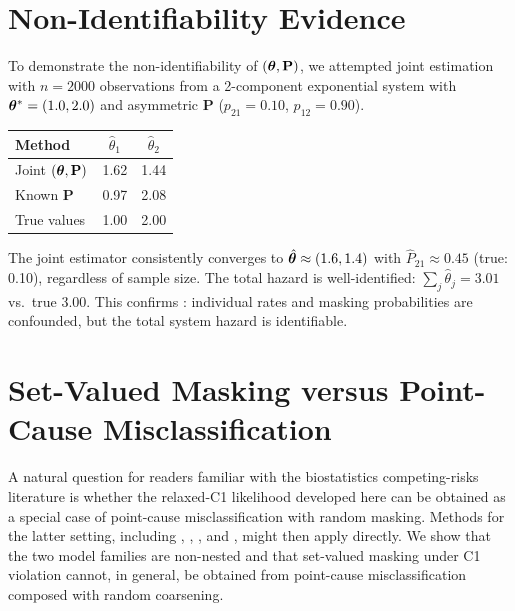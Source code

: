 \section{Non-Identifiability Evidence}
\label{sec:appendix-ident}

To demonstrate the non-identifiability of $(\bm{\theta}, \mathbf{P})$, we
attempted joint estimation with $n = 2000$ observations from a 2-component
exponential system with $\bm{\theta}^* = (1.0, 2.0)$ and asymmetric
$\mathbf{P}$ ($p_{21} = 0.10$, $p_{12} = 0.90$).

\begin{center}
\begin{tabular}{lcc}
\toprule
Method & $\hat\theta_1$ & $\hat\theta_2$ \\
\midrule
Joint $(\bm{\theta}, \mathbf{P})$ & 1.62 & 1.44 \\
Known $\mathbf{P}$ & 0.97 & 2.08 \\
True values & 1.00 & 2.00 \\
\bottomrule
\end{tabular}
\end{center}

The joint estimator consistently converges to
$\hat{\bm{\theta}} \approx (1.6, 1.4)$ with
$\hat{P}_{21} \approx 0.45$ (true: 0.10), regardless of sample size. The
total hazard is well-identified: $\sum_j \hat\theta_j = 3.01$ vs.\ true
3.00. This confirms : individual rates and masking
probabilities are confounded, but the total system hazard is identifiable.

\section{Set-Valued Masking versus Point-Cause Misclassification}
\label{app:set-vs-point}

A natural question for readers familiar with the biostatistics
competing-risks literature is whether the relaxed-C1 likelihood developed
here can be obtained as a special case of point-cause misclassification with
random masking. Methods for the latter setting, including
\citet{Ebrahimi1996}, \citet{VanRompaye2012}, \citet{HaTsodikov2015}, and
\citet{Bakoyannis2025}, might then apply directly. We show that the two
model families are non-nested and that set-valued masking under C1 violation
cannot, in general, be obtained from point-cause misclassification composed
with random coarsening.

